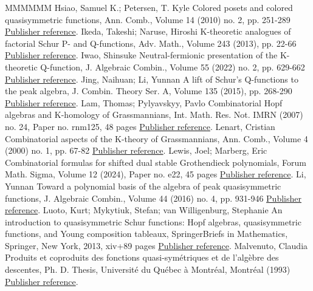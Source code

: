 \documentclass[11pt]{article}
\theoremstyle{definition}
\numberwithin{equation}{section}
\numberwithin{equation}{section}
\begin{document}
\begin{thebibliography}{MMMMMM}
 Hsiao, Samuel K.; Petersen, T. Kyle Colored posets and colored quasisymmetric functions, Ann. Comb., Volume 14 (2010) no. 2, pp. 251-289 \href{https://alco.centre-mersenne.org/articles/10.5802/alco.362/#HsiaoPetersen}{Publisher reference}.
 Ikeda, Takeshi; Naruse, Hiroshi K-theoretic analogues of factorial Schur P- and Q-functions, Adv. Math., Volume 243 (2013), pp. 22-66 \href{https://alco.centre-mersenne.org/articles/10.5802/alco.362/#IkedaNaruse}{Publisher reference}.
 Iwao, Shinsuke Neutral-fermionic presentation of the K-theoretic Q-function, J. Algebraic Combin., Volume 55 (2022) no. 2, pp. 629-662 \href{https://alco.centre-mersenne.org/articles/10.5802/alco.362/#Iwao}{Publisher reference}.
 Jing, Naihuan; Li, Yunnan A lift of Schur’s Q-functions to the peak algebra, J. Combin. Theory Ser. A, Volume 135 (2015), pp. 268-290 \href{https://alco.centre-mersenne.org/articles/10.5802/alco.362/#JingLi}{Publisher reference}.
 Lam, Thomas; Pylyavskyy, Pavlo Combinatorial Hopf algebras and K-homology of Grassmannians, Int. Math. Res. Not. IMRN (2007) no. 24, Paper no. rnm125, 48 pages \href{https://alco.centre-mersenne.org/articles/10.5802/alco.362/#LamPyl}{Publisher reference}.
 Lenart, Cristian Combinatorial aspects of the K-theory of Grassmannians, Ann. Comb., Volume 4 (2000) no. 1, pp. 67-82 \href{https://alco.centre-mersenne.org/articles/10.5802/alco.362/#Lenart2000}{Publisher reference}.
 Lewis, Joel; Marberg, Eric Combinatorial formulas for shifted dual stable Grothendieck polynomials, Forum Math. Sigma, Volume 12 (2024), Paper no. e22, 45 pages \href{https://alco.centre-mersenne.org/articles/10.5802/alco.362/#LM2022}{Publisher reference}.
 Li, Yunnan Toward a polynomial basis of the algebra of peak quasisymmetric functions, J. Algebraic Combin., Volume 44 (2016) no. 4, pp. 931-946 \href{https://alco.centre-mersenne.org/articles/10.5802/alco.362/#Li2016}{Publisher reference}.
 Luoto, Kurt; Mykytiuk, Stefan; van Willigenburg, Stephanie An introduction to quasisymmetric Schur functions: Hopf algebras, quasisymmetric functions, and Young composition tableaux, SpringerBriefs in Mathematics, Springer, New York, 2013, xiv+89 pages \href{https://alco.centre-mersenne.org/articles/10.5802/alco.362/#LMW}{Publisher reference}.
 Malvenuto, Claudia Produits et coproduits des fonctions quasi-symétriques et de l’algèbre des descentes, Ph. D. Thesis, Université du Québec à Montréal, Montréal (1993) \href{https://alco.centre-mersenne.org/articles/10.5802/alco.362/#Malvenuto}{Publisher reference}.

\end{thebibliography}
\end{document}
